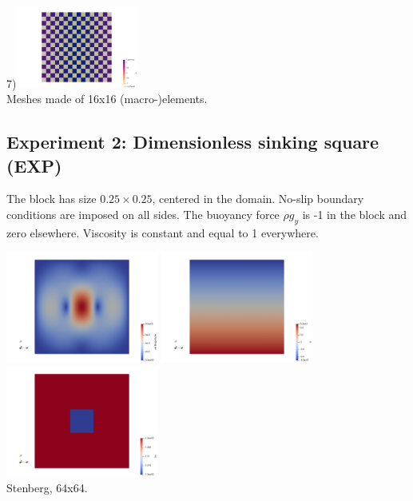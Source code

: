 \begin{center}
7)\includegraphics[width=4cm]{python_codes/fieldstone_78/results/exp01/16x16/p7}\\
{\captionfont Meshes  made of 16x16 (macro-)elements.} 
\end{center}


\newpage
\subsection*{Experiment 2: Dimensionless sinking square (EXP)}

The block has size $0.25\times 0.25$, centered in the domain. No-slip boundary conditions are imposed on all 
sides. The buoyancy force $\rho g_y$ is -1 in the block and zero elsewhere. Viscosity is constant and 
equal to 1 everywhere. 

\begin{center}
\includegraphics[width=5cm]{python_codes/fieldstone_78/results/exp02/vel}
\includegraphics[width=5cm]{python_codes/fieldstone_78/results/exp02/p}
\includegraphics[width=5cm]{python_codes/fieldstone_78/results/exp02/by}\\
{\captionfont Stenberg, 64x64.}
\end{center}

